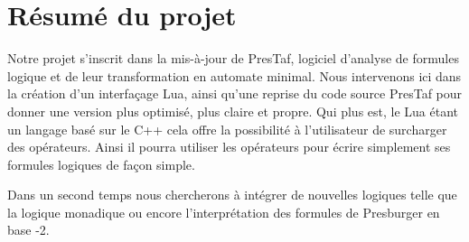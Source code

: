 \section{Résumé du projet}

Notre projet s'inscrit dans la mis-à-jour de PresTaf, logiciel d'analyse de formules logique et de leur transformation en automate minimal. Nous intervenons ici dans la création d'un interfaçage Lua, ainsi qu'une reprise du code source PresTaf pour donner une version plus optimisé, plus claire et propre. Qui plus est, le Lua étant un langage basé sur le C++ cela offre la possibilité à l'utilisateur de surcharger des opérateurs. Ainsi il pourra utiliser les opérateurs pour écrire simplement ses formules logiques de façon simple.\\\par

Dans un second temps nous chercherons à intégrer de nouvelles logiques telle que la logique monadique ou encore l'interprétation des formules de Presburger en base -2.
